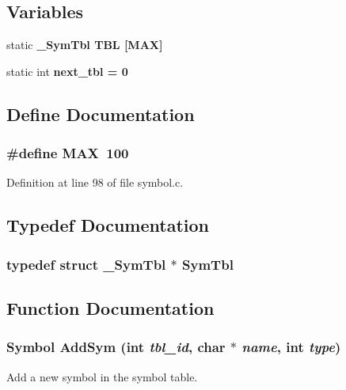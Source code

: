 \subsection*{Variables}
\begin{CompactItemize}
\item 
static \bf{\_\-Sym\-Tbl} \bf{TBL} [MAX]
\item 
static int \bf{next\_\-tbl} = 0
\end{CompactItemize}


\subsection{Define Documentation}
\subsubsection{\setlength{\rightskip}{0pt plus 5cm}\#define MAX~100}\label{symbol_8c_392fb874e547e582e9c66a08a1f23326}




Definition at line 98 of file symbol.c.

\subsection{Typedef Documentation}
\subsubsection{\setlength{\rightskip}{0pt plus 5cm}typedef struct \bf{\_\-Sym\-Tbl} $\ast$ \bf{Sym\-Tbl}}\label{symbol_8c_e56ca042859b9c5a7ae8e6e54ac02cb1}




\subsection{Function Documentation}
\subsubsection{\setlength{\rightskip}{0pt plus 5cm}\bf{Symbol} Add\-Sym (int {\em tbl\_\-id}, char $\ast$ {\em name}, int {\em type})}\label{symbol_8c_05f93640438901f9a61dbd26d507fd7c}


Add a new symbol in the symbol table. 

